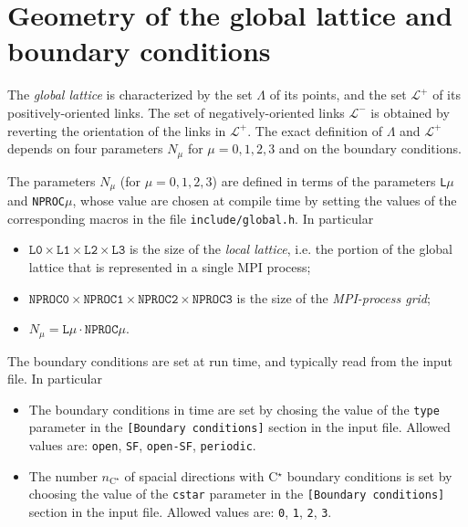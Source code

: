 \documentclass[11pt,fleqn]{article}
\begin{document}
\section{Geometry of the global lattice and boundary conditions}
\label{sec:lattice}

The \textit{global lattice} is characterized by the set $\Lambda$ of its points, and the set $\mathcal{L}^+$ of its positively-oriented links. The set of negatively-oriented links $\mathcal{L}^-$ is obtained by reverting the orientation of the links in $\mathcal{L}^+$. The exact definition of $\Lambda$ and $\mathcal{L}^+$ depends on four parameters $N_\mu$ for $\mu=0,1,2,3$ and on the boundary conditions.

The parameters $N_\mu$ (for $\mu=0,1,2,3$) are defined in terms of the parameters \texttt{L}$\mu$ and \texttt{NPROC}$\mu$, whose value are chosen at compile time by setting the values of the corresponding macros in the file \texttt{include/global.h}. In particular
\begin{itemize}[nolistsep,noitemsep]
   \item $\texttt{L0} \times \texttt{L1} \times \texttt{L2} \times \texttt{L3}$ is the size of the \textit{local lattice}, i.e. the portion of the global lattice that is represented in a single MPI process;
   \item $\texttt{NPROC0} \times \texttt{NPROC1} \times \texttt{NPROC2} \times \texttt{NPROC3}$ is the size of the \textit{MPI-process grid};
   \item $N_\mu = \texttt{L}\mu \cdot \texttt{NPROC}\mu$.
\end{itemize}
The boundary conditions are set at run time, and typically read from the input file. In particular
\begin{itemize}[nolistsep,noitemsep]
   \item The boundary conditions in time are set by chosing the value of the \texttt{type} parameter in the \texttt{[Boundary conditions]} section in the input file. Allowed values are: \texttt{open}, \texttt{SF}, \texttt{open-SF}, \texttt{periodic}.
   \item The number $n_{\text{C}^\star}$ of spacial directions with C$^\star$ boundary conditions is set by choosing the value of the \texttt{cstar} parameter in the \texttt{[Boundary conditions]} section in the input file. Allowed values are: \texttt{0}, \texttt{1}, \texttt{2}, \texttt{3}.
\end{itemize}
\end{document}
